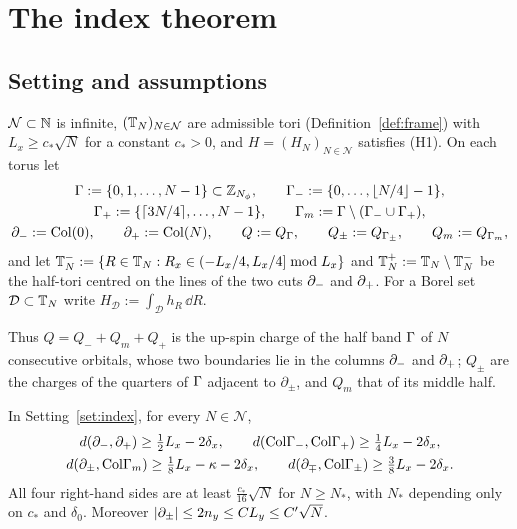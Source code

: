 \section{The index theorem}\label{sec:index}

\subsection{Setting and assumptions}

\begin{setting}\label{set:index}
$\mathcal N\subset\mathbb{N}$ is infinite, $(\mathbb{T}_N)_{N\in\mathcal N}$ are admissible tori (Definition~\ref{def:frame}) with
$L_x\ge c_*\sqrt N$ for a constant $c_*>0$, and $H=(H_N)_{N\in\mathcal N}$ satisfies (H1). On each torus let
\begin{gather*}
\Gamma:=\{0,1,\dots,N-1\}\subset\mathbb{Z}_{N_{\phi}},\qquad\Gamma_{-}:=\{0,\dots,\lfloor N/4\rfloor-1\},\\
\Gamma_{+}:=\{\lceil3N/4\rceil,\dots,N-1\},\qquad\Gamma_{m}:=\Gamma\setminus(\Gamma_{-}\cup\Gamma_{+}),\\
\partial_{-}:=\mathrm{Col}(0),\qquad\partial_{+}:=\mathrm{Col}(N),\qquad Q:=Q_\Gamma,\qquad Q_\pm:=Q_{\Gamma_\pm},\qquad Q_m:=Q_{\Gamma_{m}},
\end{gather*}
and let $\mathbb{T}_N^-:=\{R\in\mathbb{T}_N:R_x\in(-L_x/4,L_x/4]\bmod L_x\}$ and $\mathbb{T}_N^+:=\mathbb{T}_N\setminus\mathbb{T}_N^-$ be the
half-tori centred on the lines of the two cuts $\partial_{-}$ and $\partial_{+}$. For a Borel set $\mathcal D\subset\mathbb{T}_N$ write
$H_{\mathcal D}:=\int_{\mathcal D}h_R\,\dd R$.
\end{setting}

Thus $Q=Q_-+Q_m+Q_+$ is the up-spin charge of the half band $\Gamma$ of $N$ consecutive orbitals, whose two
boundaries lie in the columns $\partial_{-}$ and $\partial_{+}$; $Q_\pm$ are the charges of the quarters of $\Gamma$ adjacent to
$\partial_\pm$, and $Q_m$ that of its middle half.

\begin{lemma}[separations]\label{lem:separations}
In Setting~\ref{set:index}, for every $N\in\mathcal N$,
\begin{gather*}
d(\partial_{-},\partial_{+})\ge\tfrac12L_x-2\delta_x,\qquad d(\mathrm{Col}\Gamma_{-},\mathrm{Col}\Gamma_{+})\ge\tfrac14L_x-2\delta_x,\\
d(\partial_\pm,\mathrm{Col}\Gamma_{m})\ge\tfrac18L_x-\kappa-2\delta_x,\qquad d(\partial_\mp,\mathrm{Col}\Gamma_\pm)\ge\tfrac38L_x-2\delta_x .
\end{gather*}
All four right-hand sides are at least $\frac{c_*}{16}\sqrt N$ for $N\ge N_*$, with $N_*$ depending only on $c_*$
and $\delta_0$. Moreover $\lvert\partial_\pm\rvert\le2n_y\le CL_y\le C'\sqrt N$.
\end{lemma}

